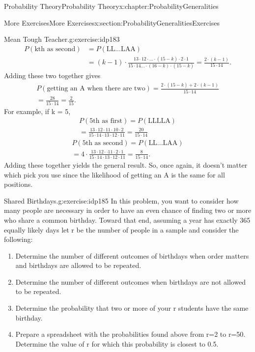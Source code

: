 \documentclass[oneside,10pt,]{book}
\numberwithin{equation}{section}
\begin{document}
\begin{chapterptx}{Probability Theory}{}{Probability Theory}{}{}{x:chapter:ProbabilityGeneralities}
\begin{sectionptx}{More Exercises}{}{More Exercises}{}{}{x:section:ProbabilityGeneralitiesExercises}
\begin{inlineexercise}{Mean Tough Teacher.}{g:exercise:idp183}
\begin{align*}
P(\text{kth as second}) & = P(\text{LL...LAA})\\
& = (k-1) \cdot \frac{13 \cdot 12 \cdot ... \cdot (15-k) \cdot 2 \cdot 1}{15 \cdot 14 ... \cdot (16-k) \cdot (15-k)} = \frac{2 \cdot (k-1)}{15 \cdot 14}.
\end{align*}
Adding these two together gives%
\begin{gather*}
P(\text{getting an A when there are two}) = \frac{2 \cdot (15-k) + 2 \cdot (k-1)}{15 \cdot 14}\\
= \frac{28}{15 \cdot 14} = \frac{2}{15}.
\end{gather*}
For example, if k = 5,%
\begin{gather*}
P(\text{5th as first}) = P(\text{LLLLA}) \\
= \frac{13 \cdot 12 \cdot 11 \cdot 10  \cdot 2}{15 \cdot 14 \cdot 13 \cdot 12 \cdot 11} = \frac{20}{15 \cdot 14}
\end{gather*}
%
\begin{gather*}
P(\text{5th as second}) = P(\text{LL...LAA}) \\
= 4 \cdot \frac{13 \cdot 12 \cdot \cdot 11 \cdot 2 \cdot 1}{15 \cdot 14 \cdot 13 \cdot 12 \cdot 11} = \frac{8}{15 \cdot 14}.
\end{gather*}
Adding these together yields the general result. So, once again, it doesn't matter which pick you use since the likelihood of getting an A is the same for all positions.%
\end{inlineexercise}%
\begin{inlineexercise}{Shared Birthdays.}{g:exercise:idp185}%
In this problem, you want to consider how many people are necessary in order to have an even chance of finding two or more who share a common birthday. Toward that end, assuming a year has exactly 365 equally likely days let r be the number of people in a sample and consider the following:%
\begin{enumerate}
\item{}Determine the number of different outcomes of birthdays when order matters and birthdays are allowed to be repeated.%
\item{}Determine the number of different outcomes when birthdays are not allowed to be repeated.%
\item{}Determine the probability that two or more of your r students have the same birthday.%
\item{}Prepare a spreadsheet with the probabilities found above from r=2 to r=50. Determine the value of r for which this probability is closest to 0.5.%

\end{enumerate}
\end{inlineexercise}
\end{sectionptx}
\end{chapterptx}
\end{document}
